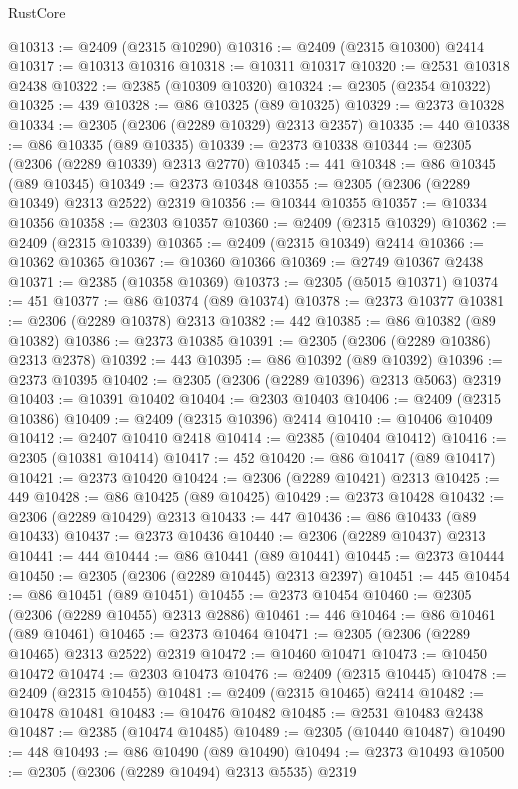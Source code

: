 \begin{lexlean}{RustCore}
\begin{coremodule}
@10313 := @2409 (@2315 @10290)
@10316 := @2409 (@2315 @10300) @2414
@10317 := @10313 @10316
@10318 := @10311 @10317
@10320 := @2531 @10318 @2438
@10322 := @2385 (@10309 @10320)
@10324 := @2305 (@2354 @10322)
@10325 := 439
@10328 := @86 @10325 (@89 @10325)
@10329 := @2373 @10328
@10334 := @2305 (@2306 (@2289 @10329) @2313 @2357)
@10335 := 440
@10338 := @86 @10335 (@89 @10335)
@10339 := @2373 @10338
@10344 := @2305 (@2306 (@2289 @10339) @2313 @2770)
@10345 := 441
@10348 := @86 @10345 (@89 @10345)
@10349 := @2373 @10348
@10355 := @2305 (@2306 (@2289 @10349) @2313 @2522) @2319
@10356 := @10344 @10355
@10357 := @10334 @10356
@10358 := @2303 @10357
@10360 := @2409 (@2315 @10329)
@10362 := @2409 (@2315 @10339)
@10365 := @2409 (@2315 @10349) @2414
@10366 := @10362 @10365
@10367 := @10360 @10366
@10369 := @2749 @10367 @2438
@10371 := @2385 (@10358 @10369)
@10373 := @2305 (@5015 @10371)
@10374 := 451
@10377 := @86 @10374 (@89 @10374)
@10378 := @2373 @10377
@10381 := @2306 (@2289 @10378) @2313
@10382 := 442
@10385 := @86 @10382 (@89 @10382)
@10386 := @2373 @10385
@10391 := @2305 (@2306 (@2289 @10386) @2313 @2378)
@10392 := 443
@10395 := @86 @10392 (@89 @10392)
@10396 := @2373 @10395
@10402 := @2305 (@2306 (@2289 @10396) @2313 @5063) @2319
@10403 := @10391 @10402
@10404 := @2303 @10403
@10406 := @2409 (@2315 @10386)
@10409 := @2409 (@2315 @10396) @2414
@10410 := @10406 @10409
@10412 := @2407 @10410 @2418
@10414 := @2385 (@10404 @10412)
@10416 := @2305 (@10381 @10414)
@10417 := 452
@10420 := @86 @10417 (@89 @10417)
@10421 := @2373 @10420
@10424 := @2306 (@2289 @10421) @2313
@10425 := 449
@10428 := @86 @10425 (@89 @10425)
@10429 := @2373 @10428
@10432 := @2306 (@2289 @10429) @2313
@10433 := 447
@10436 := @86 @10433 (@89 @10433)
@10437 := @2373 @10436
@10440 := @2306 (@2289 @10437) @2313
@10441 := 444
@10444 := @86 @10441 (@89 @10441)
@10445 := @2373 @10444
@10450 := @2305 (@2306 (@2289 @10445) @2313 @2397)
@10451 := 445
@10454 := @86 @10451 (@89 @10451)
@10455 := @2373 @10454
@10460 := @2305 (@2306 (@2289 @10455) @2313 @2886)
@10461 := 446
@10464 := @86 @10461 (@89 @10461)
@10465 := @2373 @10464
@10471 := @2305 (@2306 (@2289 @10465) @2313 @2522) @2319
@10472 := @10460 @10471
@10473 := @10450 @10472
@10474 := @2303 @10473
@10476 := @2409 (@2315 @10445)
@10478 := @2409 (@2315 @10455)
@10481 := @2409 (@2315 @10465) @2414
@10482 := @10478 @10481
@10483 := @10476 @10482
@10485 := @2531 @10483 @2438
@10487 := @2385 (@10474 @10485)
@10489 := @2305 (@10440 @10487)
@10490 := 448
@10493 := @86 @10490 (@89 @10490)
@10494 := @2373 @10493
@10500 := @2305 (@2306 (@2289 @10494) @2313 @5535) @2319

\end{coremodule}
\end{lexlean}
